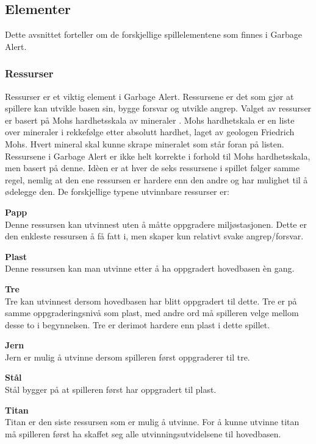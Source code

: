 



\subsection{Elementer} \label{sec:spillelement}
Dette avsnittet forteller om de forskjellige spillelementene som finnes
i Garbage Alert.
\subsubsection{Ressurser}
Ressurser er et viktig element i Garbage Alert. Ressursene er det som
gjør at spillere kan utvikle basen sin, bygge forsvar og utvikle angrep.
Valget av ressurser er basert på Mohs hardhetsskala av mineraler \cite{mohs}. Mohs hardhetskala er en liste over mineraler i rekkefølge etter absolutt hardhet, laget av geologen Friedrich Mohs. Hvert mineral skal kunne skrape mineralet som står foran på listen. Ressursene i Garbage Alert er ikke helt korrekte i forhold til Mohs hardhetsskala, men basert på denne. Idèen er at hver de seks ressursene i spillet følger samme regel, nemlig at den ene ressursen er hardere enn den andre og har mulighet til å ødelegge den. 
De forskjellige typene utvinnbare ressurser er:
\begin{description}
	\item \textbf{Papp}\\ Denne ressursen kan utvinnest uten å måtte
oppgradere miljøstasjonen. Dette er den enkleste ressursen å få fatt i,
men skaper kun relativt svake angrep/forsvar.
	\item \textbf{Plast}\\ Denne ressursen kan man utvinne etter å ha
oppgradert hovedbasen èn gang.
	\item \textbf{Tre}\\ Tre kan utvinnest dersom hovedbasen har blitt
oppgradert til dette. Tre er på samme oppgraderingsnivå som plast, med andre ord må
spilleren velge mellom desse to i begynnelsen. Tre er derimot hardere enn plast i dette spillet.
	\item \textbf{Jern}\\ Jern er mulig å utvinne dersom spilleren først
oppgraderer til tre.
	\item \textbf{Stål}\\ Stål bygger på at spilleren først har
oppgradert til plast.
	\item \textbf{Titan}\\ Titan er den siste ressursen som er mulig å
utvinne. For å kunne utvinne titan må spilleren først ha skaffet seg
alle utvinningsutvidelsene til hovedbasen.
\end{description}


